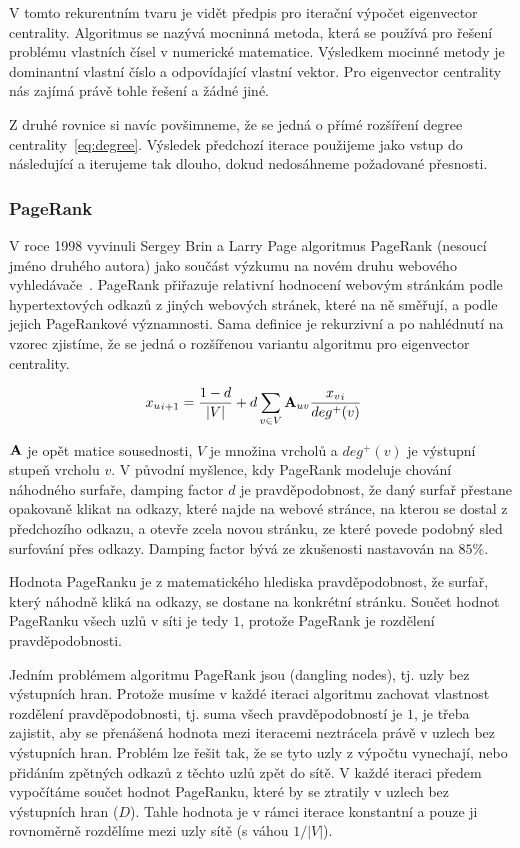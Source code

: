 \documentclass{bakalarka}
\begin{document}
V tomto rekurentním tvaru je vidět předpis pro iterační výpočet eigenvector
centrality. Algoritmus se nazývá mocninná metoda, která se používá pro řešení
problému vlastních čísel v numerické matematice. Výsledkem mocinné metody je
dominantní vlastní číslo a odpovídající vlastní vektor. Pro eigenvector
centrality nás zajímá právě tohle řešení a žádné jiné.

Z druhé rovnice si navíc povšimneme, že se jedná o přímé rozšíření degree
centrality~\eqref{eq:degree}. Výsledek předchozí iterace použijeme jako vstup
do následující a iterujeme tak dlouho, dokud nedosáhneme požadované přesnosti.

\subsubsection{PageRank}
V roce 1998 vyvinuli Sergey Brin a Larry Page algoritmus PageRank (nesoucí
jméno druhého autora) jako součást výzkumu na novém druhu webového
vyhledávače~\citep{pagerankoriginal,visemalseed2005,page1997}. PageRank
přiřazuje relativní hodnocení webovým stránkám podle hypertextových odkazů z
jiných webových stránek, které na ně směřují, a podle jejich PageRankové
významnosti. Sama definice je rekurzivní a po nahlédnutí na vzorec zjistíme, že
se jedná o rozšířenou variantu algoritmu pro eigenvector centrality.

\begin{align*}
{x_u}_{i + 1} &= \frac{1 - d}{|V|} + d \displaystyle\sum_{v \in V} {\bf A}_{uv}
\frac{{x_v}_{i}}{deg^+ (v)}
\end{align*}

${\bf A}$ je opět matice sousednosti, $V$ je množina vrcholů a $deg^+(v)$ je
výstupní stupeň vrcholu $v$.  V původní myšlence, kdy PageRank modeluje chování
náhodného surfaře, damping factor $d$ je pravděpodobnost, že daný surfař
přestane opakovaně klikat na odkazy, které najde na webové stránce, na kterou
se dostal z předchozího odkazu, a otevře zcela novou stránku, ze které povede
podobný sled surfování přes odkazy.  Damping factor bývá ze zkušenosti
nastavován na $85\%$.

Hodnota PageRanku je z matematického hlediska pravděpodobnost, že surfař, který
náhodně kliká na odkazy, se dostane na konkrétní stránku. Součet hodnot
PageRanku všech uzlů v síti je tedy $1$, protože PageRank je rozdělení
pravděpodobnosti.

Jedním problémem algoritmu PageRank jsou  (dangling nodes), tj.
uzly bez výstupních hran. Protože musíme v každé iteraci algoritmu zachovat
vlastnost rozdělení pravděpodobnosti, tj. suma všech pravděpodobností je $1$,
je třeba zajistit, aby se přenášená hodnota mezi iteracemi neztrácela právě v
uzlech bez výstupních hran. Problém lze řešit tak, že se tyto uzly z výpočtu
vynechají, nebo přidáním zpětných odkazů z těchto uzlů zpět do sítě.  V každé
iteraci předem vypočítáme součet hodnot PageRanku, které by se ztratily v
uzlech bez výstupních hran ($D$). Tahle hodnota je v rámci iterace konstantní a
pouze ji rovnoměrně rozdělíme mezi uzly sítě (s váhou $1/|V|$).
\end{document}
